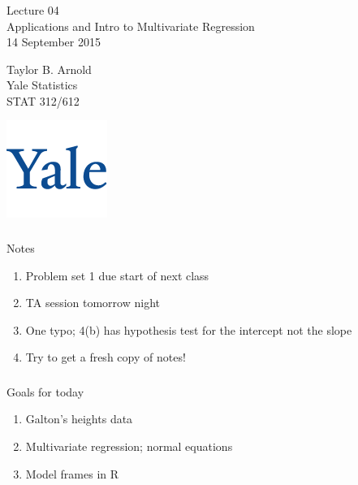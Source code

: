 



\begin{frame}[fragile] \frametitle{}

\vfill

{\fontsize{0.7cm}{0cm}\selectfont Lecture 04 \\\vspace{0.2cm} Applications
and Intro to Multivariate Regression}\\\vspace{0.5cm}
14 September 2015

\vspace{2cm}

\begin{minipage}{0.6\textwidth}
Taylor B. Arnold \\
Yale Statistics \\
STAT 312/612
\end{minipage}
\hfill
\begin{minipage}{0.3\textwidth}\raggedleft
\includegraphics[scale=0.3]{../yale-logo.png}
\end{minipage}%

\end{frame}

\begin{frame}[fragile] \frametitle{}

{\color{yaleblue}\fontsize{16pt}{20pt}\selectfont Notes}

\begin{enumerate}
\item Problem set 1 due start of next class
\item TA session tomorrow night
\item One typo; 4(b) has hypothesis test for the intercept not the slope
\item Try to get a fresh copy of notes!
\end{enumerate}

\end{frame}

\begin{frame}[fragile] \frametitle{}

{\color{yaleblue}\fontsize{16pt}{20pt}\selectfont Goals for today}

\begin{enumerate}
\item Galton's heights data
\item Multivariate regression; normal equations
\item Model frames in R
\end{enumerate}

\end{frame}

